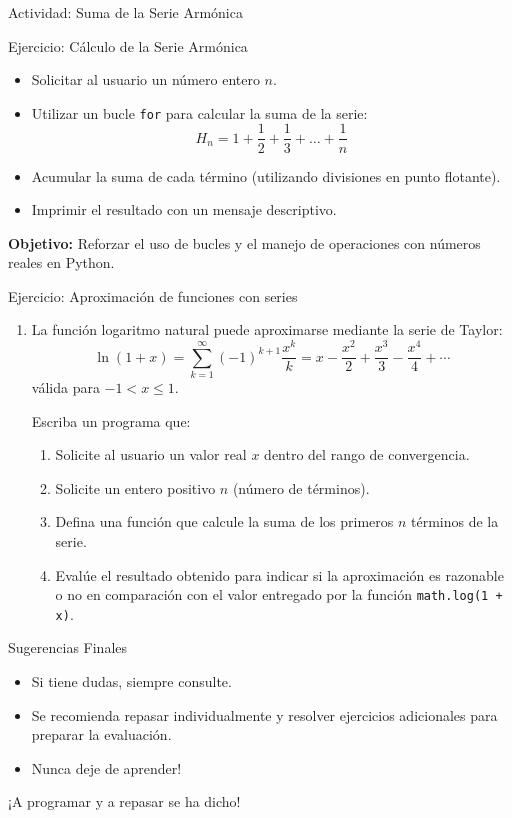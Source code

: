 \documentclass[10pt]{beamer}
\begin{document}
\begin{frame}[fragile]{Actividad: Suma de la Serie Armónica} 
    \begin{block}{Ejercicio: Cálculo de la Serie Armónica} 
        \begin{itemize} 
            \item Solicitar al usuario un número entero $n$. 
            \item Utilizar un bucle \texttt{for} para calcular la suma de la serie: 
            $$H_n = 1 + \frac{1}{2} + \frac{1}{3} + \ldots + \frac{1}{n}$$
            \item Acumular la suma de cada término (utilizando divisiones en punto flotante). 
            \item Imprimir el resultado con un mensaje descriptivo. 
        \end{itemize} 
    \end{block} 
    \vspace{0.2cm} 
    \textbf{Objetivo:} Reforzar el uso de bucles y el manejo de operaciones con números reales en Python.
\end{frame}


\begin{frame}{Ejercicio: Aproximación de funciones con series}
    \begin{enumerate}
        \item La función logaritmo natural puede aproximarse mediante la serie de Taylor:
        \[
        \ln(1 + x) = \sum_{k=1}^{\infty} (-1)^{k+1} \frac{x^k}{k}
        = x - \frac{x^2}{2} + \frac{x^3}{3} - \frac{x^4}{4} + \cdots
        \]
        válida para \( -1 < x \leq 1 \).

        Escriba un programa que:
        \begin{enumerate}
            \item Solicite al usuario un valor real \( x \) dentro del rango de convergencia.
            \item Solicite un entero positivo \( n \) (número de términos).
            \item Defina una función que calcule la suma de los primeros \( n \) términos de la serie.
            \item Evalúe el resultado obtenido para indicar si la aproximación es razonable o no en comparación con el valor entregado por la función \texttt{math.log(1 + x)}.
        \end{enumerate}
    \end{enumerate}
\end{frame}

\begin{frame}{Sugerencias Finales}
  \begin{itemize}
    \item Si tiene dudas, siempre consulte.
    \item Se recomienda repasar individualmente y resolver ejercicios adicionales para preparar la evaluación.
    \item Nunca deje de aprender!
  \end{itemize}
  \vspace{0.2cm}
  \centerline{\Large ¡A programar y a repasar se ha dicho!}
\end{frame}
\end{document}
